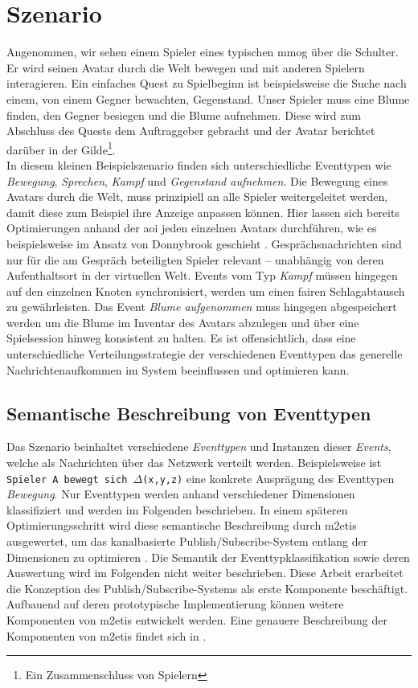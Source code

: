 \section{Szenario}
\label{chap:grundlagen:szenario}
Angenommen, wir sehen einem Spieler eines typischen \ac{mmog} über die Schulter. Er wird seinen Avatar durch die Welt bewegen und mit anderen Spielern interagieren. Ein einfaches Quest zu Spielbeginn ist beispielsweise die Suche nach einem, von einem Gegner bewachten, Gegenstand. Unser Spieler muss eine Blume finden, den Gegner besiegen und die Blume aufnehmen. Diese wird zum Abschluss des Quests dem Auftraggeber gebracht und der Avatar berichtet darüber in der Gilde\footnote{Ein Zusammenschluss von Spielern}.\\
In diesem kleinen Beispielszenario finden sich unterschiedliche Eventtypen wie \emph{Bewegung}, \emph{Sprechen}, \emph{Kampf} und \emph{Gegenstand aufnehmen}. Die Bewegung eines Avatars durch die Welt, muss prinzipiell an alle Spieler weitergeleitet werden, damit diese zum Beispiel ihre Anzeige anpassen können. Hier lassen sich bereits Optimierungen anhand der \ac{aoi} jeden einzelnen Avatars durchführen, wie es beispielsweise im Ansatz von Donnybrook geschieht \cite{Bharambe2008Donnybrook}. Gesprächsnachrichten sind nur für die am Gespräch beteiligten Spieler relevant -- unabhängig von deren Aufenthaltsort in der virtuellen Welt. Events vom Typ \emph{Kampf} müssen hingegen auf den einzelnen Knoten synchronisiert, werden um einen fairen Schlagabtausch zu gewährleisten. Das Event \emph{Blume aufgenommen} muss hingegen abgespeichert werden um die Blume im Inventar des Avatars abzulegen und über eine Spielsession hinweg konsistent zu halten. Es ist offensichtlich, dass eine unterschiedliche Verteilungsstrategie der verschiedenen Eventtypen das generelle Nachrichtenaufkommen im System beeinflussen und optimieren kann.

\subsection{Semantische Beschreibung von Eventtypen}
Das Szenario beinhaltet verschiedene \emph{Eventtypen} und Instanzen dieser \emph{Events}, welche als Nachrichten über das Netzwerk verteilt werden. Beispielsweise ist \texttt{Spieler A bewegt sich $\Delta$(x,y,z)} eine konkrete Ausprägung des Eventtypen \emph{Bewegung}. Nur Eventtypen werden anhand verschiedener Dimensionen klassifiziert und werden im Folgenden beschrieben. In einem späteren Optimierungsschritt wird diese semantische Beschreibung durch \ac{m2etis} ausgewertet, um das kanalbasierte Publish/Subscribe-System entlang der Dimensionen zu optimieren \cite{Fischer2010a}. Die Semantik der Eventtypklassifikation sowie deren Auswertung wird im Folgenden nicht weiter beschrieben. Diese Arbeit erarbeitet die Konzeption des Publish/Subscribe-Systems als erste Komponente beschäftigt. Aufbauend auf deren prototypische Implementierung können weitere Komponenten von \ac{m2etis} entwickelt werden. Eine genauere Beschreibung der Komponenten von \ac{m2etis} findet sich in .

